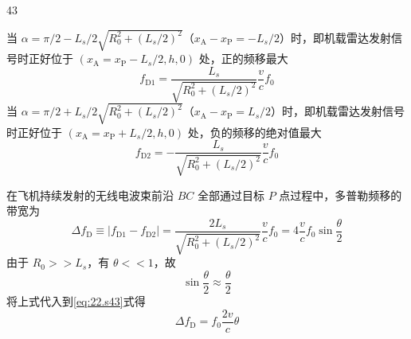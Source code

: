\begin{solution}{43}
\begin{subsolution}
        当 $\alpha = \pi/2 - L_{s}/2\sqrt{R_{0}^{2} + (L_{s}/2)^{2}}$（$x_{\mathrm{A}} - x_{\mathrm{P}} = -L_{s}/2$）时，即机载雷达发射信号时正好位于 $(x_{\mathrm{A}} = x_{\mathrm{P}} - L_{s}/2, h, 0)$ 处，正的频移最大
        \begin{equation}
            f_{\mathrm{D}1} = \frac{L_{s}}{\sqrt{R_{0}^{2} + (L_{s}/2)^{2}}}\frac{v}{c}f_{0}
            \label{eq:20.s43}
        \end{equation}
        当 $\alpha = \pi/2 + L_{s}/2\sqrt{R_{0}^{2} + (L_{s}/2)^{2}}$（$x_{\mathrm{A}} - x_{\mathrm{P}} = L_{s}/2$）时，即机载雷达发射信号时正好位于 $(x_{\mathrm{A}} = x_{\mathrm{P}} + L_{s}/2, h, 0)$ 处，负的频移的绝对值最大
        \begin{equation}
            f_{\mathrm{D}2} = -\frac{L_{s}}{\sqrt{R_{0}^{2} + (L_{s}/2)^{2}}}\frac{v}{c}f_{0}
            \label{eq:21.s43}
        \end{equation}
    \end{subsolution}
    \begin{subsolution}
        在飞机持续发射的无线电波束前沿 $BC$ 全部通过目标 $P$ 点过程中，多普勒频移的带宽为
        \begin{equation}
            \Delta f_{\mathrm{D}} \equiv |f_{\mathrm{D}1} - f_{\mathrm{D}2}| = \frac{2L_{s}}{\sqrt{R_{0}^{2} + (L_{s}/2)^{2}}}\frac{v}{c}f_{0} = 4\frac{v}{c}f_{0}\sin\frac{\theta}{2}
            \label{eq:22.s43}
        \end{equation}
        由于 $R_{0} >> L_{s}$，有 $\theta << 1$，故
        \begin{equation}
            \sin\frac{\theta}{2} \approx \frac{\theta}{2}
            \label{eq:23.s43}
        \end{equation}
        将上式代入到\eqref{eq:22.s43}式得
        \begin{equation}
            \Delta f_{\mathrm{D}} = f_{0}\frac{2v}{c}\theta
            \label{eq:24.s43}
        \end{equation}
    \end{subsolution}
\end{solution}